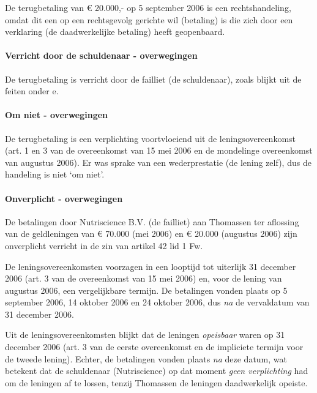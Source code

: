 \documentclass[
  dutch,
  a4paper,
]{article}
\begin{document}
De terugbetaling van € 20.000,- op 5 september 2006 is een rechtshandeling, omdat dit een op een rechtsgevolg gerichte wil (betaling) is die zich door een verklaring (de daadwerkelijke betaling) heeft geopenbaard.

\paragraph{Verricht door de schuldenaar - overwegingen}\label{verricht-door-de-schuldenaar---overwegingen-78}

De terugbetaling is verricht door de failliet (de schuldenaar), zoals blijkt uit de feiten onder e.

\paragraph{Om niet - overwegingen}\label{om-niet---overwegingen-78}

De terugbetaling is een verplichting voortvloeiend uit de leningsovereenkomst (art. 1 en 3 van de overeenkomst van 15 mei 2006 en de mondelinge overeenkomst van augustus 2006). Er was sprake van een wederprestatie (de lening zelf), dus de handeling is niet `om niet'.

\paragraph{Onverplicht - overwegingen}\label{onverplicht---overwegingen-78}

De betalingen door Nutriscience B.V. (de failliet) aan Thomassen ter aflossing van de geldleningen van € 70.000 (mei 2006) en € 20.000 (augustus 2006) zijn onverplicht verricht in de zin van artikel 42 lid 1 Fw.

De leningsovereenkomsten voorzagen in een looptijd tot uiterlijk 31 december 2006 (art. 3 van de overeenkomst van 15 mei 2006) en, voor de lening van augustus 2006, een vergelijkbare termijn. De betalingen vonden plaats op 5 september 2006, 14 oktober 2006 en 24 oktober 2006, dus \emph{na} de vervaldatum van 31 december 2006.

Uit de leningsovereenkomsten blijkt dat de leningen \emph{opeisbaar} waren op 31 december 2006 (art. 3 van de eerste overeenkomst en de impliciete termijn voor de tweede lening). Echter, de betalingen vonden plaats \emph{na} deze datum, wat betekent dat de schuldenaar (Nutriscience) op dat moment \emph{geen verplichting} had om de leningen af te lossen, tenzij Thomassen de leningen daadwerkelijk opeiste.
\end{document}

